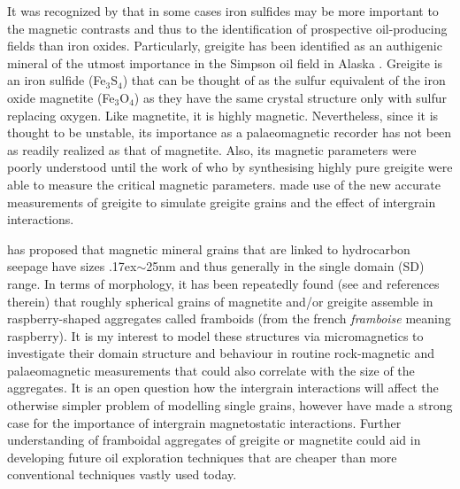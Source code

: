 It was recognized by \citet{Reynolds} that in some cases iron sulfides may be more important to the magnetic contrasts and thus to the identification of prospective oil-producing fields than iron oxides. Particularly, greigite has been identified as an authigenic mineral of the utmost importance in the Simpson oil field in Alaska \citep{Reynolds}. Greigite is an iron sulfide (Fe$_3$S$_4$) that can be thought of as the sulfur equivalent of the iron oxide magnetite (Fe$_3$O$_4$) as they have the same crystal structure only with sulfur replacing oxygen. Like magnetite, it is highly magnetic. Nevertheless, since it is thought to be unstable, its importance as a palaeomagnetic recorder has not been as readily realized as that of magnetite. Also, its magnetic parameters were poorly understood until the work of \citet{Chang} who by synthesising highly pure greigite were able to measure the critical magnetic parameters. \citet{Mxwt1} made use of the new accurate measurements of greigite to simulate greigite grains and the effect of intergrain interactions.\par

\citet{Liu} has proposed that magnetic mineral grains that are linked to hydrocarbon seepage have sizes {\raise.17ex\hbox{$\scriptstyle\sim$}}25nm and thus generally in the single domain (SD) range. In terms of morphology, it has been repeatedly found (see \citet{Aldana} and references therein) that roughly spherical grains of magnetite and/or greigite assemble in raspberry-shaped aggregates called framboids (from the french \textit{framboise} meaning raspberry). It is my interest to model these structures via micromagnetics to investigate their domain structure and behaviour in routine rock-magnetic and palaeomagnetic measurements that could also correlate with the size of the aggregates. It is an open question how the intergrain interactions will affect the otherwise simpler problem of modelling single grains, however \citet{Mxwt1} have made a strong case for the importance of intergrain magnetostatic interactions. Further understanding of framboidal aggregates of greigite or magnetite could aid in developing future oil exploration techniques that are cheaper than more conventional techniques vastly used today.\par